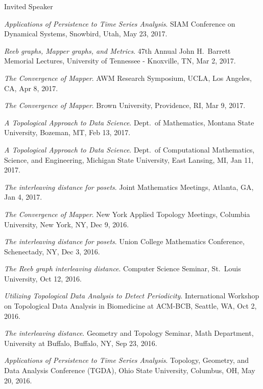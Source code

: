 \documentclass{resume} %
\begin{document}
\begin{rSection}{Invited Speaker}
\begin{etaremune}
\item\emph{Applications of Persistence to Time Series Analysis}. SIAM Conference on Dynamical Systems, Snowbird, Utah, May 23, 2017. 

\item\emph{Reeb graphs, Mapper graphs, and Metrics}. 47th Annual John H.~Barrett Memorial Lectures, University of Tennessee - Knoxville, TN, Mar 2, 2017. 

\item\emph{The Convergence of Mapper}. AWM Research Symposium, UCLA, Los Angeles, CA, Apr 8, 2017. 

\item\emph{The Convergence of Mapper}. Brown University, Providence, RI, Mar 9, 2017. 

\item\emph{A Topological Approach to Data Science}. Dept.~of Mathematics, Montana State University, Bozeman, MT, Feb 13, 2017. 

\item\emph{A Topological Approach to Data Science}. Dept.~of Computational Mathematics, Science, and Engineering, Michigan State University, East Lansing, MI, Jan 11, 2017. 

\item\emph{The interleaving distance for posets}. Joint Mathematics Meetings, Atlanta, GA, Jan 4, 2017. 

\item\emph{The Convergence of Mapper}. New York Applied Topology Meetings, Columbia University, New York, NY, Dec 9, 2016. 

\item\emph{The interleaving distance for posets}. Union College Mathematics Conference, Schenectady, NY, Dec 3, 2016. 

\item\emph{The Reeb graph interleaving distance}. Computer Science Seminar, St.~Louis University, Oct 12, 2016. 

\item\emph{Utilizing Topological Data Analysis to Detect Periodicity}. International Workshop on Topological Data Analysis in Biomedicine at ACM-BCB, Seattle, WA, Oct 2, 2016. 

\item\emph{The interleaving distance}. Geometry and Topology Seminar, Math Department, University at Buffalo, Buffalo, NY, Sep 23, 2016. 

\item\emph{Applications of Persistence to Time Series Analysis}. Topology, Geometry, and Data Analysis Conference (TGDA), Ohio State University, Columbus, OH, May 20, 2016. 


\end{etaremune}
\end{rSection}
\end{document}
